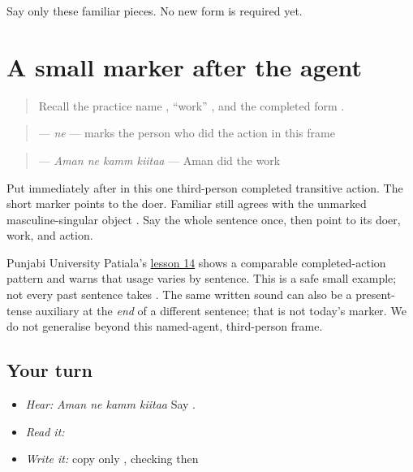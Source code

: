 \begin{tcolorbox}[breakable,colback=teal!4,colframe=teal!35!black,title={Before you move on}]
Say only these familiar pieces. No new form is required yet.
\end{tcolorbox}
\section[\texorpdfstring{\pa{ਨੇ} (ne)}{ਨੇ (ne)}]{A small marker after the agent}

\label{lesson:PA-C210-ne}



\begin{quote}
Recall the practice name \textbf{}, “work” \textbf{}, and the completed form \textbf{}.
\end{quote}

\begin{grammarlens}[title={Grammar Lens: direct owner}]
\begin{quote}
\textbf{} — \emph{ne} — marks the person who did the action in this frame
\end{quote}

\begin{quote}
\textbf{   } — \emph{Aman ne kamm kiitaa} — Aman did the work
\end{quote}

Put \textbf{} immediately after \textbf{} in this one third-person completed transitive action. The short marker points to the doer. Familiar \textbf{} still agrees with the unmarked masculine-singular object \textbf{}. Say the whole sentence once, then point to its doer, work, and action.
\end{grammarlens}

\begin{grammarlens}[title={Grammar Lens: source boundary}]
Punjabi University Patiala's \href{https://pt.learnpunjabi.org/lesson14.aspx?l=14}{lesson 14} shows a comparable completed-action pattern and warns that usage varies by sentence. This is a safe small example; not every past sentence takes \textbf{}. The same written sound can also be a present-tense auxiliary at the \emph{end} of a different sentence; that is not today's marker. We do not generalise beyond this named-agent, third-person frame.
\end{grammarlens}

\subsection*{Your turn}
\begin{itemize}
\raggedright
  \item \emph{Hear:} \emph{Aman ne kamm kiitaa} Say \textbf{   }.
  \item \emph{Read it:} \textbf{   }
  \item \emph{Write it:} copy only \textbf{}, checking \textbf{} then \textbf{}
\end{itemize}

